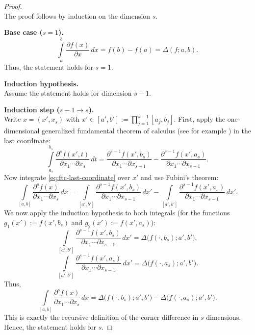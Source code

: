 \begin{proof} \ \\
The proof follows by induction on the dimension $s$.

\textbf{Base case ($s=1$).}
\begin{equation*}
    \int\limits_{a}^{b} \frac{\partial f(x)}{\partial x} \, dx
    = f(b) - f(a) = \Delta(f;a,b).
\end{equation*}
Thus, the statement holds for $s=1$.

\textbf{Induction hypothesis.}\\
Assume the statement holds for dimension $s-1$.

\textbf{Induction step ($s-1 \to s$).}\\
Write $x = (x',x_s)$ with $x' \in [a',b'] := \prod_{j=1}^{s-1} [a_j,b_j]$.
First, apply the one-dimensional generalized fundamental theorem of calculus (see for example \cite{stein2009real}) in
the last coordinate:
\begin{equation}
\int\limits_{a_s}^{b_s} 
\frac{\partial^s f(x',t)}{\partial x_1 \cdots \partial x_s} \, dt
= \frac{\partial^{s-1} f(x',b_s)}{\partial x_1 \cdots \partial x_{s-1}}
 - \frac{\partial^{s-1} f(x',a_s)}{\partial x_1 \cdots \partial x_{s-1}}.
 \label{eq:ftc-last-coordinate}
\end{equation}
Now integrate \eqref{eq:ftc-last-coordinate} over $x'$ and use Fubini's theorem:
\begin{equation*}
\int\limits_{[a,b]} 
\frac{\partial^s f(x)}{\partial x_1 \cdots \partial x_s} \, dx
= \int\limits_{[a',b']} \frac{\partial^{s-1} f(x',b_s)}{\partial x_1 \cdots \partial x_{s-1}} \, dx'
 - \int\limits_{[a',b']} \frac{\partial^{s-1} f(x',a_s)}{\partial x_1 \cdots \partial x_{s-1}} \, dx'.
\end{equation*}
We now apply the induction hypothesis to both integrals (for the functions
$g_1(x') := f(x',b_s)$ and $g_2(x') := f(x',a_s)$):
\begin{equation*}
\int\limits_{[a',b']} \frac{\partial^{s-1} f(x',b_s)}{\partial x_1 \cdots \partial x_{s-1}} \, dx'
= \Delta\big(f(\cdot,b_s);a',b'\big),
\end{equation*}
\begin{equation*}
\int\limits_{[a',b']} \frac{\partial^{s-1} f(x',a_s)}{\partial x_1 \cdots \partial x_{s-1}} \, dx'
= \Delta\big(f(\cdot,a_s);a',b'\big).
\end{equation*}
Thus,
\begin{equation*}
\int\limits_{[a,b]} 
\frac{\partial^s f(x)}{\partial x_1 \cdots \partial x_s} \, dx
= \Delta\big(f(\cdot,b_s);a',b'\big)
 - \Delta\big(f(\cdot,a_s);a',b'\big).
\end{equation*}
This is exactly the recursive definition of the corner difference in $s$
dimensions. Hence, the statement holds for $s$.
\end{proof}

